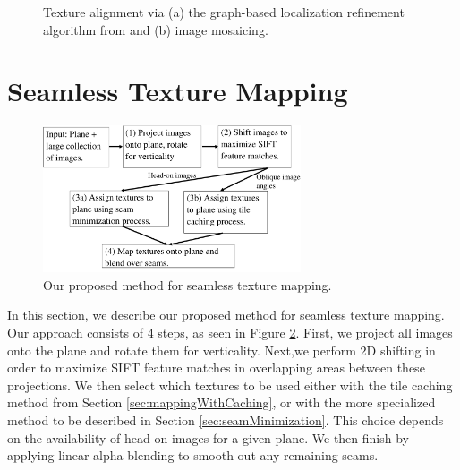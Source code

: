 \documentclass[10pt,twocolumn,letterpaper]{article}
\begin{document}
\begin{figure}
  \centering

  \centering {}
  \caption{Texture alignment via (a) the graph-based localization
    refinement algorithm from \cite{chen2010indoor} and (b) image
    mosaicing.}
  \label{fig:mosaic3D}
\end{figure}




\section{Seamless Texture Mapping}
\label{sec:proposedApproach}

\begin{figure}
  \centering
  \includegraphics[width=3in]{pipeline.pdf}
  \caption{Our proposed method for seamless texture mapping.}
  \label{fig:pipeline}
\end{figure}


In this section, we describe our proposed method for seamless texture
mapping. Our approach consists of 4 steps, as seen in Figure
\ref{fig:pipeline}.  First, we project all images onto the plane and
rotate them for verticality. Next,we perform 2D shifting in order to
maximize SIFT feature matches in overlapping areas between these
projections. We then select which textures to be used either with the
tile caching method from Section \ref{sec:mappingWithCaching}, or with
the more specialized method to be described in Section
\ref{sec:seamMinimization}. This choice depends on the availability of
head-on images for a given plane. We then finish by applying linear
alpha blending to smooth out any remaining seams.
\end{document}
